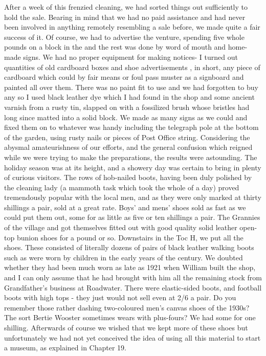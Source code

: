 After a week of this frenzied cleaning, we had sorted things out sufficiently to hold the sale. Bearing in mind that we had no paid assistance and had never been involved in anything remotely resembling a sale before, we made quite a fair success of it. Of course, we had to advertise the venture, spending five whole pounds on a block in the  and the rest was done by word of mouth and home-made signs. We had no proper equipment for making notices- I turned out quantities of old cardboard boxes and shoe advertisements , in short, any piece of cardboard which could by fair means or foul pass muster as a signboard and painted  all over them. There was no paint fit to use and we had forgotten to buy any so I used black leather dye which I had found in the shop and some ancient varnish from a rusty tin, slapped on with a fossilized brush whose bristles had long since matted into a solid block. We made as many signs as we could and fixed them on to whatever was handy including the telegraph pole at the bottom of the garden, using rusty nails or pieces of Post Office string. Considering the abysmal amateurishness of our efforts, and the general confusion which reigned while we were trying to make the preparations, the results were astounding. The holiday season was at its height, and a showery day was certain to bring in plenty of curious visitors. The rows of hob-nailed boots, having been duly polished by the cleaning lady (a mammoth task which took the whole of a day) proved tremendously popular with the local men, and as they were only marked at thirty shillings a pair, sold at a great rate. Boys' and mens' shoes sold as fast as we could put them out, some for as little as five or ten shillings a pair. The Grannies of the village  and got themselves fitted out with good quality solid leather open-top bunion shoes for a pound or so. Downstairs in the Toc H, we put all the  shoes. These consisted of literally dozens of pairs of black leather walking boots such as were worn by children in the early years of the century. We doubted whether they had been much worn as late as 1921 when William built the shop, and I can only assume that he had brought with him all the remaining stock from Grandfather's business at Roadwater. There were elastic-sided boots, and football boots with high tops - they just would not sell even at 2/6 a pair. Do you remember those rather dashing two-coloured men's canvas shoes of the 1930s? The sort Bertie Wooster sometimes wears with plus-fours? We had some for one shilling. Afterwards of course we wished that we kept more of these shoes but unfortunately we had not yet conceived the idea of using all this material to start a museum, as explained in Chapter 19.

